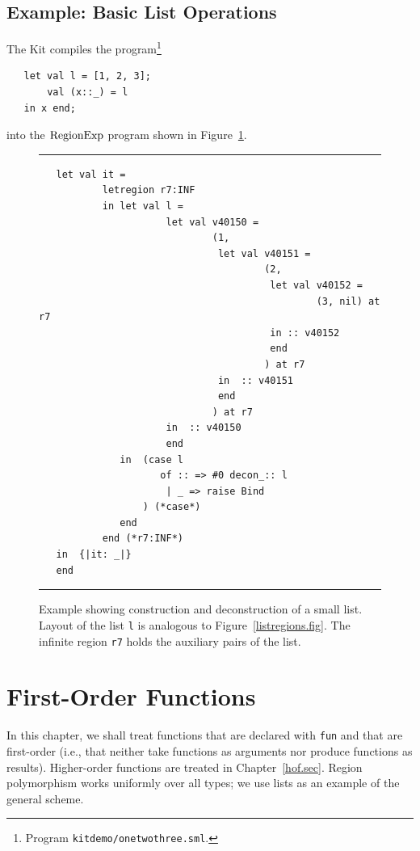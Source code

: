 \documentclass[12pt]{book}
\begin{document}
\section{Example: Basic List Operations}
\label{listexamples.sec}
The Kit compiles the program\footnote{Program \texttt{kitdemo/onetwothree.sml}.}  
\begin{verbatim}
   let val l = [1, 2, 3];
       val (x::_) = l
   in x end;
\end{verbatim}       
into the $\hbox{\rm RegionExp}$ program shown in Figure~\ref{listprint.fig}.
\begin{figure}
\hrule \medskip
\begin{verbatim}
   let val it = 
           letregion r7:INF 
           in let val l = 
                      let val v40150 = 
                              (1, 
                               let val v40151 = 
                                       (2, 
                                        let val v40152 = 
                                                (3, nil) at r7 
                                        in :: v40152 
                                        end 
                                       ) at r7
                               in  :: v40151
                               end 
                              ) at r7
                      in  :: v40150
                      end 
              in  (case l 
                     of :: => #0 decon_:: l 
                      | _ => raise Bind
                  ) (*case*) 
              end  
           end (*r7:INF*)
   in  {|it: _|}
   end 
\end{verbatim}
\caption{Example showing construction and deconstruction of a small list.
Layout of the list {\tt l} is analogous to Figure~\ref{listregions.fig}.
The infinite region {\tt r7} holds the auxiliary pairs of the list.
}
\label{listprint.fig}
\medskip

\hrule
\end{figure}


\chapter{First-Order Functions}
In this chapter, we shall treat
%
%
functions that are declared with 
{\tt fun} and that are first-order (i.e., that neither take functions
as arguments nor produce functions as results). Higher-order functions
are treated in Chapter~\ref{hof.sec}.  Region polymorphism works
uniformly over all types; we use lists as an example of the general
scheme.
\end{document}
